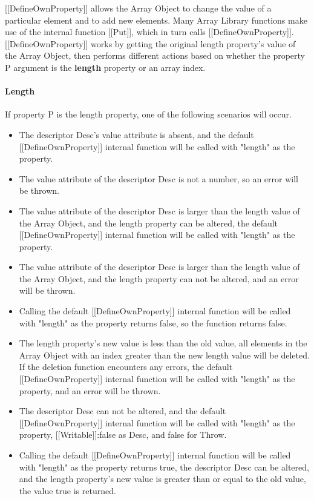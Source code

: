 \documentclass[a4paper,11pt,twoside]{report}
\begin{document}
[[DefineOwnProperty]] allows the Array Object to change the value of a particular element and to add new elements. Many Array Library functions make use of the internal function [[Put]], which in turn calls [[DefineOwnProperty]]. [[DefineOwnProperty]] works by getting the original length property's value of the Array Object, then performs different actions based on whether the property P argument is the \textbf{length} property or an array index. 

\paragraph{Length}
If property P is the length property, one of the following scenarios will occur.
\begin{itemize}
\item The descriptor Desc's value attribute is absent, and the default [[DefineOwnProperty]] internal function will be called with "length" as the property.
\item The value attribute of the descriptor Desc is not a number, so an error will be thrown.
\item The value attribute of the descriptor Desc is larger than the length value of the Array Object, and the length property can be altered, the default [[DefineOwnProperty]] internal function will be called with "length" as the property.
\item The value attribute of the descriptor Desc is larger than the length value of the Array Object, and the length property can not be altered, and an error will be thrown.
\item Calling the default [[DefineOwnProperty]] internal function will be called with "length" as the property returns false, so the function returns false.
\item The length property's new value is less than the old value, all elements in the Array Object with an index greater than the new length value will be deleted. If the deletion function encounters any errors, the default [[DefineOwnProperty]] internal function will be called with "length" as the property, and an error will be thrown.
\item The descriptor Desc can not be altered, and the default [[DefineOwnProperty]] internal function will be called with "length" as the property, [[Writable]]:false as Desc, and false for Throw.
\item Calling the default [[DefineOwnProperty]] internal function will be called with "length" as the property returns true, the descriptor Desc can be altered, and the length property's new value is greater than or equal to the old value, the value true is returned.
\end{itemize}
\end{document}
